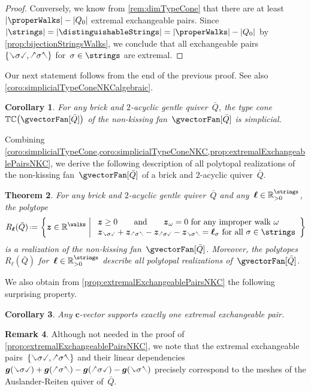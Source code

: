 \documentclass{amsart}
\newtheorem{theorem}{Theorem}[section]
\newtheorem{corollary}[theorem]{Corollary}
\theoremstyle{definition}
\newtheorem{remark}[theorem]{Remark}
\newcommand{\R}{\mathbb{R}} %
\renewcommand{\b}[1]{{\boldsymbol{#1}}} %
\newcommand{\set}[2]{\left\{ #1 \;\middle|\; #2 \right\}} %
\newcommand{\eqdef}{\mbox{\,\raisebox{0.2ex}{\scriptsize\ensuremath{\mathrm:}}\ensuremath{=}\,}} %
\newcommand{\gvector}[1]{\b{g}(#1)} %
\newcommand{\typeCone}{\mathbb{TC}} %
\newcommand{\quiver}{\bar Q} %
\newcommand{\hL}{\text{\rotatebox[origin=c]{180}{\checked}}}
\newcommand{\hR}{\text{\rotatebox[origin=c]{180}{\reflectbox{\checked}}}}
\newcommand{\cL}{\text{\reflectbox{\checked}}}
\newcommand{\cR}{\text{\checked}}
\newcommand{\hh}[1]{\hL#1\hR} %
\newcommand{\cc}[1]{\cL#1\cR} %
\newcommand{\hc}[1]{\hL#1\cR} %
\newcommand{\ch}[1]{\cL#1\hR} %
\begin{document}
\begin{proof}
Conversely, we know from \cref{rem:dimTypeCone} that there are at least~$|\properWalks|-|Q_0|$ extremal exchangeable pairs. Since~$|\strings| = |\distinguishableStrings| = |\properWalks| - |Q_0|$ by \cref{prop:bijectionStringsWalks}, we conclude that all exchangeable pairs~$\{\cc{\sigma}, \hh{\sigma}\}$ for~$\sigma \in \strings$ are extremal.
\end{proof}

Our next statement follows from the end of the previous proof.
See also \cref{coro:simplicialTypeConeNKCalgebraic}.

\begin{corollary}
\label{coro:simplicialTypeConeNKC}
For any brick and $2$-acyclic gentle quiver~$\quiver$, the type cone~$\typeCone \big( \gvectorFan[\quiver] \big)$ of the non-kissing fan~$\gvectorFan[\quiver]$ is simplicial.
\end{corollary}

Combining \cref{coro:simplicialTypeCone,coro:simplicialTypeConeNKC,prop:extremalExchangeablePairsNKC}, we derive the following description of all polytopal realizations of the non-kissing fan~$\gvectorFan[\quiver]$ of a brick and $2$-acyclic quiver~$\quiver$.

\begin{theorem}
\label{thm:allPolytopalRealizationsNKC}
For any brick and $2$-acyclic gentle quiver~$\quiver$ and any~$\b{\ell} \in \R_{>0}^{\strings}$, the polytope
\[
R_\b{\ell}(\quiver) \eqdef \set{\b{z} \in \R^{\walks}}{\begin{array}{l} \b{z} \ge 0 \qquad\text{and}\qquad \b{z}_\omega = 0 \text{ for any improper walk } \omega \\ \b{z}_{\cc{\sigma}} + \b{z}_{\hh{\sigma}} - \b{z}_{\hc{\sigma}} - \b{z}_{\ch{\sigma}} = \b{\ell}_\sigma \text{ for all } \sigma \in \strings\end{array}}
\]
is a realization of the non-kissing fan~$\gvectorFan[\quiver]$.
Moreover, the polytopes~$R_\b{\ell}(\quiver)$ for~$\b{\ell} \in \R_{>0}^{\strings}$ describe all polytopal realizations of~$\gvectorFan[\quiver]$.
\end{theorem}

We also obtain from \cref{prop:extremalExchangeablePairsNKC} the following surprising property.

\begin{corollary}
Any $\b{c}$-vector supports exactly one extremal exchangeable pair.
\end{corollary}

\begin{remark}
\label{rem:meshARquiver}
Although not needed in the proof of \cref{prop:extremalExchangeablePairsNKC}, we note that the extremal exchangeable pairs~$\{\cc{\sigma}, \hh{\sigma}\}$ and their linear dependencies~${\gvector{\cc{\sigma}} + \gvector{\hh{\sigma}} - \gvector{\hc{\sigma}} - \gvector{\ch{\sigma}}}$ precisely correspond to the meshes of the Auslander-Reiten quiver of~$\quiver$.
\end{remark}
\end{document}
